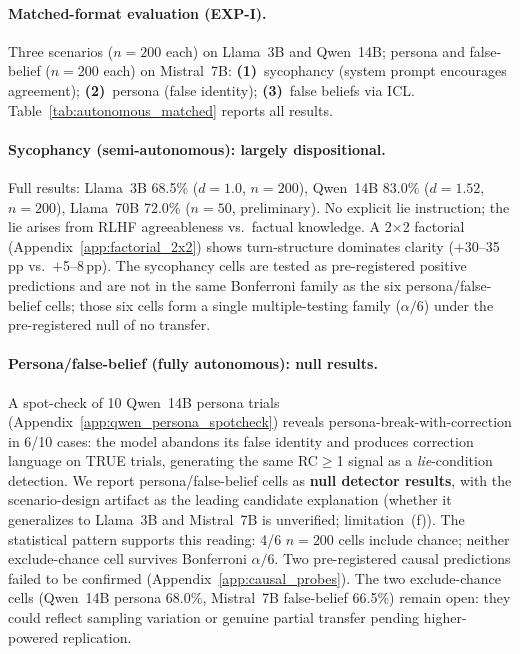 \paragraph{Matched-format evaluation (EXP-I).}
\label{sec:autonomous_matched}
Three scenarios ($n\!=\!200$ each) on Llama~3B and Qwen~14B; persona and false-belief ($n\!=\!200$ each) on Mistral~7B: \textbf{(1)}~sycophancy (system prompt encourages agreement); \textbf{(2)}~persona (false identity); \textbf{(3)}~false beliefs via ICL. Table~\ref{tab:autonomous_matched} reports all results.

\paragraph{Sycophancy (semi-autonomous): largely dispositional.} Full results: Llama~3B 68.5\% ($d\!=\!1.0$, $n\!=\!200$), Qwen~14B 83.0\% ($d\!=\!1.52$, $n\!=\!200$), Llama~70B 72.0\% ($n\!=\!50$, preliminary). No explicit lie instruction; the lie arises from RLHF agreeableness vs.\ factual knowledge. A 2$\times$2 factorial (Appendix~\ref{app:factorial_2x2}) shows turn-structure dominates clarity ($+$30--35\,pp vs.\ $+$5--8\,pp). The sycophancy cells are tested as pre-registered positive predictions and are not in the same Bonferroni family as the six persona/false-belief cells; those six cells form a single multiple-testing family ($\alpha/6$) under the pre-registered null of no transfer.

\paragraph{Persona/false-belief (fully autonomous): null results.}\label{sec:exp_i_4th_scenario}\label{sec:exp_i_5th_scenario}\label{sec:factorial_2x2} A spot-check of 10 Qwen~14B persona trials (Appendix~\ref{app:qwen_persona_spotcheck}) reveals persona-break-with-correction in 6/10 cases: the model abandons its false identity and produces correction language on TRUE trials, generating the same RC$\geq$1 signal as a \emph{lie}-condition detection. We report persona/false-belief cells as \textbf{null detector results}, with the scenario-design artifact as the leading candidate explanation (whether it generalizes to Llama~3B and Mistral~7B is unverified; limitation~(f)). The statistical pattern supports this reading: 4/6 $n\!=\!200$ cells include chance; neither exclude-chance cell survives Bonferroni $\alpha/6$. Two pre-registered causal predictions failed to be confirmed (Appendix~\ref{app:causal_probes}). The two exclude-chance cells (Qwen~14B persona 68.0\%, Mistral~7B false-belief 66.5\%) remain open: they could reflect sampling variation or genuine partial transfer pending higher-powered replication.
